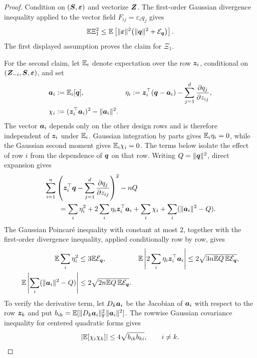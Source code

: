 \documentclass{article}
\theoremstyle{plain} %
\theoremstyle{definition} %
\theoremstyle{definition} %
\begin{document}
\begin{proof}
Condition on $(\boldsymbol{S},{\boldsymbol{\varepsilon} })$ and vectorize $\boldsymbol{Z}$.  The first-order Gaussian
divergence inequality applied to the vector field
$F_{ij}=\varepsilon_iq_j$ gives
\begin{align*}
    {\mathbb{E}}\Xi_1^2
    \leq {\mathbb{E}}\left[\lVert{\boldsymbol{\varepsilon} }\rVert^2
       \bigl(\lVert\boldsymbol{q}\rVert^2+{\mathcal E}_{\boldsymbol{q}}\bigr)\right].
\end{align*}
The first displayed assumption proves the claim for $\Xi_1$.

For the second claim, let ${\mathbb{E}}_i$ denote expectation over the row $\boldsymbol{z}_i$,
conditional on $(\boldsymbol{Z}_{-i},\boldsymbol{S},{\boldsymbol{\varepsilon} })$, and set
\begin{align*}
    \boldsymbol{a}_i&:={\mathbb{E}}_i[\boldsymbol{q}],
    & \eta_i&:=\boldsymbol{z}_i^\top(\boldsymbol{q}-\boldsymbol{a}_i)
       -\sum_{j=1}^d\pdv{q_j}{z_{ij}},\\
    \chi_i&:=(\boldsymbol{z}_i^\top\boldsymbol{a}_i)^2-\lVert\boldsymbol{a}_i\rVert^2.
\end{align*}
The vector $\boldsymbol{a}_i$ depends only on the other design rows and is
therefore independent of $\boldsymbol{z}_i$ under ${\mathbb{E}}_i$. Gaussian integration by
parts gives ${\mathbb{E}}_i\eta_i=0$, while the Gaussian second moment gives
${\mathbb{E}}_i\chi_i=0$. The terms below isolate the effect of row $i$ from
the dependence of $\boldsymbol{q}$ on that row.
Writing $Q=\lVert\boldsymbol{q}\rVert^2$, direct expansion gives
\begin{align*}
    &\sum_{i=1}^n\left(
       \boldsymbol{z}_i^\top\boldsymbol{q}-\sum_{j=1}^d\pdv{q_j}{z_{ij}}
    \right)^2-nQ\\
    &\qquad=\sum_i\eta_i^2
       +2\sum_i\eta_i\boldsymbol{z}_i^\top\boldsymbol{a}_i
       +\sum_i\chi_i
       +\sum_i(\lVert\boldsymbol{a}_i\rVert^2-Q).
\end{align*}
The Gaussian Poincar\'e inequality with constant at most $2$, together with the
first-order divergence inequality, applied conditionally row by row, gives
\begin{align*}
    {\mathbb{E}}\sum_i\eta_i^2
       &\leq3{\mathbb{E}}{\mathcal E}_{\boldsymbol{q}},
    &
    {\mathbb{E}}\left|2\sum_i\eta_i\boldsymbol{z}_i^\top\boldsymbol{a}_i\right|
       &\leq2\sqrt{3n{\mathbb{E}} Q\,{\mathbb{E}}{\mathcal E}_{\boldsymbol{q}}},
    \\
    {\mathbb{E}}\left|\sum_i(\lVert\boldsymbol{a}_i\rVert^2-Q)\right|
       &\leq2\sqrt{2n{\mathbb{E}} Q\,{\mathbb{E}}{\mathcal E}_{\boldsymbol{q}}}.
\end{align*}
To verify the derivative term, let $D_k\boldsymbol{a}_i$ be the Jacobian of $\boldsymbol{a}_i$ with respect
to the row $\boldsymbol{z}_k$ and put
$b_{ik}={\mathbb{E}}[\lVert D_k\boldsymbol{a}_i\rVert_{\rm F}^2\lVert\boldsymbol{a}_i\rVert^2]$.
The rowwise Gaussian covariance inequality for centered quadratic forms gives
\begin{align*}
    |{\mathbb{E}}[\chi_i\chi_k]|
       \leq4\sqrt{b_{ik}b_{ki}},\qquad i\ne k.
\end{align*}

\end{proof}
\end{document}
